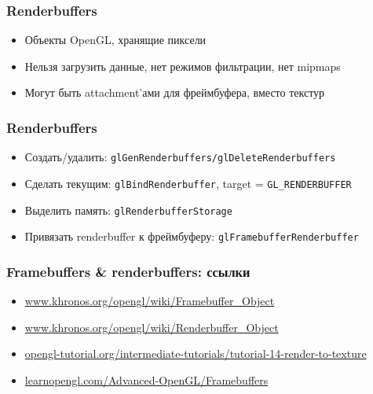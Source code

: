 \documentclass{beamer}
\begin{document}
\begin{frame}[fragile]
\frametitle{Renderbuffers}
\begin{itemize}
\item Объекты OpenGL, хранящие пиксели
\pause
\item Нельзя загрузить данные, нет режимов фильтрации, нет mipmaps
\pause
\item Могут быть attachment'ами для фреймбуфера, вместо текстур
\end{itemize}
\end{frame}

\begin{frame}[fragile]
\frametitle{Renderbuffers}
\begin{itemize}
\item Создать/удалить: \verb|glGenRenderbuffers/glDeleteRenderbuffers|
\pause
\item Сделать текущим: \verb|glBindRenderbuffer|, target = \verb|GL_RENDERBUFFER|
\pause
\item Выделить память: \verb|glRenderbufferStorage|
\pause
\item Привязать renderbuffer к фреймбуферу: \verb|glFramebufferRenderbuffer|
\end{itemize}
\end{frame}

\begin{frame}[fragile]
\frametitle{Framebuffers \& renderbuffers: ссылки}
\begin{itemize}
\item \href{https://www.khronos.org/opengl/wiki/Framebuffer_Object}{www.khronos.org/opengl/wiki/Framebuffer\_Object}
\item \href{https://www.khronos.org/opengl/wiki/Renderbuffer_Object}{www.khronos.org/opengl/wiki/Renderbuffer\_Object}
\item \href{http://www.opengl-tutorial.org/intermediate-tutorials/tutorial-14-render-to-texture}{opengl-tutorial.org/intermediate-tutorials/tutorial-14-render-to-texture}
\item \href{https://learnopengl.com/Advanced-OpenGL/Framebuffers}{learnopengl.com/Advanced-OpenGL/Framebuffers}
\end{itemize}
\end{frame}
\end{document}
